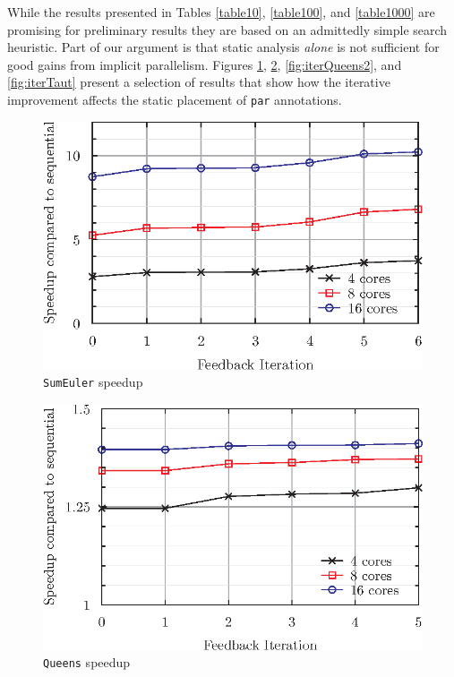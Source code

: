 While the results presented in Tables \ref{table10}, \ref{table100}, and
\ref{table1000} are promising for preliminary results they are based on an
admittedly simple search heuristic. Part of our argument is that static
analysis \emph{alone} is not sufficient for good gains from implicit
parallelism. Figures \ref{fig:iterSum}, \ref{fig:iterQueens},
\ref{fig:iterQueens2}, and \ref{fig:iterTaut} present a selection of results
that show how the iterative improvement affects the static placement of
\verb-par- annotations.

\clearpage

\begin{figure}[H]
    \includegraphics[width=\textwidth]{Informed/Figures/IterSum.eps}
    \caption[SE]{\texttt{SumEuler} speedup}
    \label{fig:iterSum}
\end{figure}
\vfill
\begin{figure}[H]
    \includegraphics[width=\textwidth]{Informed/Figures/IterQueens.eps}
    \caption[Q]{\texttt{Queens} speedup}
    \label{fig:iterQueens}
\end{figure}

